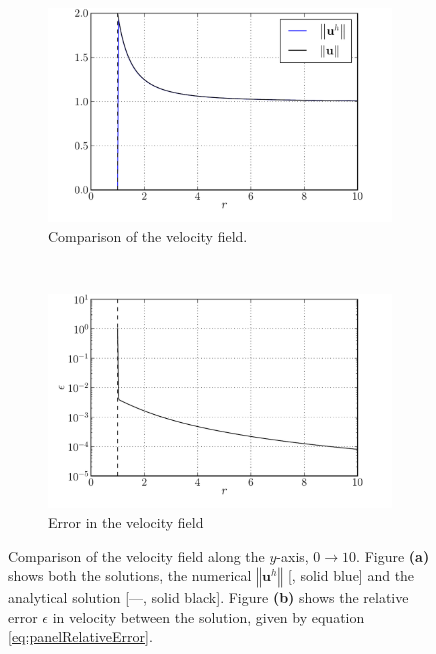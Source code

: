 	\begin{figure}[p]
     \centering
     \begin{subfigure}[b]{0.5\textwidth}
             \includegraphics[width=\textwidth]{figures/lagrangian/panelCylinder_versusAnalytical.pdf}
             \caption{Comparison of the velocity field.}
             \label{fig:panelCylinder_versusAnalytical}
     \end{subfigure}%
     ~ %
     \begin{subfigure}[b]{0.5\textwidth}
             \includegraphics[width=\textwidth]{figures/lagrangian/panelCylinder_error.pdf}
             \caption{Error in the velocity field}
             \label{fig:panelCylinder_error}
     \end{subfigure}
     \caption{Comparison of the velocity field along the $y$-axis, $0\rightarrow10$. Figure \textbf{(a)} shows both the solutions, the numerical $\left\Vert\mathbf{u}^h\right\Vert$ [{\color{plotBlue}{---}}, solid blue] and the analytical solution [---, solid black]. Figure \textbf{(b)} shows the relative error $\epsilon$ in velocity between the solution, given by equation \ref{eq:panelRelativeError}.}
     \label{fig:panelCylinderComparision}
	\end{figure}


